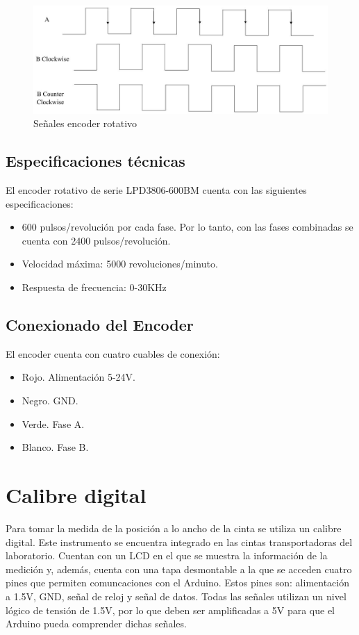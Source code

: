 \begin{figure}[hbtp]
	\centering
	\includegraphics[width=\textwidth]{02-hardware/05-encoder.jpg}
	\caption{Señales encoder rotativo}
	\label{fig:figura25}
	\end{figure}

\subsection{Especificaciones técnicas}

El encoder rotativo de serie LPD3806-600BM cuenta con las
siguientes especificaciones:
\begin{itemize}
    \item 600 pulsos/revolución por cada fase. Por lo tanto, con las
    fases combinadas se cuenta con 2400 pulsos/revolución.
    \item Velocidad máxima: 5000 revoluciones/minuto.
    \item Respuesta de frecuencia: 0-30KHz
\end{itemize}

\subsection{Conexionado del Encoder}

El encoder cuenta con cuatro cuables de conexión:
\begin{itemize}
    \item Rojo. Alimentación 5-24V.
    \item Negro. GND.
    \item Verde. Fase A.
    \item Blanco. Fase B.
\end{itemize}

\section{Calibre digital}

Para tomar la medida de la posición a lo ancho de la cinta se utiliza
un calibre digital. Este instrumento se encuentra integrado en las
cintas transportadoras del laboratorio. Cuentan con un LCD en el que
se muestra la información de la medición y, además, cuenta con una tapa 
desmontable a la que se acceden cuatro pines que permiten comuncaciones
con el Arduino. Estos pines son: alimentación a 1.5V, GND, señal de 
reloj y señal de datos. Todas las señales utilizan un nivel lógico de 
tensión de 1.5V, por lo que deben ser amplificadas a 5V para que el 
Arduino pueda comprender dichas señales.

